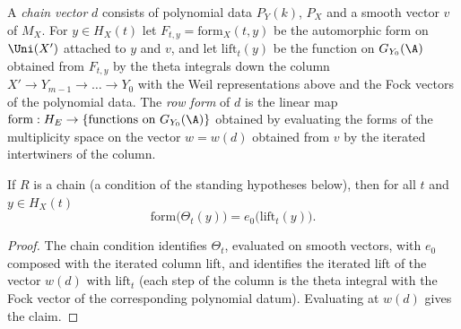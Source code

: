 \begin{definition}\label{def:pf:rowprops:chain}
A \emph{chain vector} $d$ consists of polynomial data $P_Y(k)$, $P_X$ and a smooth vector $v$ of $M_X$. For
$y\in H_X(t)$ let $F_{t,y}=\mathrm{form}_X(t,y)$ be the automorphic form on $\Uni(X')$ attached to $y$ and $v$, and let
$\mathrm{lift}_t(y)$ be the function on $G_{Y_0}(\A)$ obtained from $F_{t,y}$ by the theta integrals down the column
$X'\to Y_{m-1}\to\dots\to Y_0$ with the Weil representations above and the Fock vectors of the polynomial data. The
\emph{row form} of $d$ is the linear map $\mathrm{form}:H_E\to\{\text{functions on }G_{Y_0}(\A)\}$ obtained by evaluating
the forms of the multiplicity space on the vector $w=w(d)$ obtained from $v$ by the iterated intertwiners of the
column.
\end{definition}

\begin{lemma}\label{pf:rowprops:formTh}
If $R$ is a chain (a condition of the standing hypotheses below), then for all $t$ and $y\in H_X(t)$
\begin{equation}\label{eq:pf:rowprops:formTh}
\mathrm{form}\bigl(\Theta_t(y)\bigr)=e_0\bigl(\mathrm{lift}_t(y)\bigr).
\end{equation}
\end{lemma}

\begin{proof}
The chain condition identifies $\Theta_t$, evaluated on smooth vectors, with $e_0$ composed with the iterated column
lift, and identifies the iterated lift of the vector $w(d)$ with $\mathrm{lift}_t$ (each step of the column is the theta
integral with the Fock vector of the corresponding polynomial datum). Evaluating at $w(d)$ gives the claim.
\end{proof}

